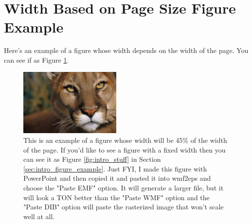 
\section{Width Based on Page Size Figure Example} \label{sec:appendxia_figure_example}
Here's an example of a figure whose width depends on the width
of the page. You can see if as Figure \ref{fig:appendix_some_pic}.

\begin{figure}[htbp]
  \centering
  \includegraphics[width=0.45\textwidth]{figures/appendixa/some_pic}
  \caption[Example Width Based on Page Size Figure]{
    This is an example of a figure whose width will be 45\% of the
    width of the page. If you'd like to see a figure with a fixed
    width then you can see it as Figure \ref{fig:intro_stuff} in
    Section \ref{sec:intro_figure_example}. Just FYI, I made this
    figure with PowerPoint and then copied it and pasted it into
    wmf2eps and choose the "Paste EMF" option. It will generate
    a larger file, but it will look a TON better than the
    "Paste WMF" option and the "Paste DIB" option will paste the
    rasterized image that won't scale well at all.}
  \label{fig:appendix_some_pic}
\end{figure}